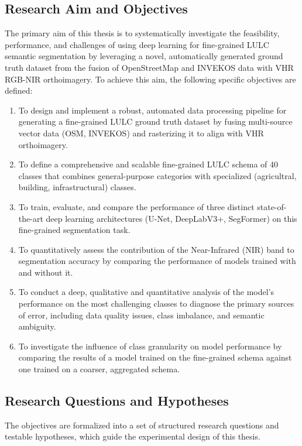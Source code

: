\documentclass{report}
\begin{document}
\subsection{Research Aim and Objectives}
The primary aim of this thesis is to systematically investigate the feasibility, performance, and challenges of using deep learning for fine-grained LULC semantic segmentation by leveraging a novel, automatically generated ground truth dataset from the fusion of OpenStreetMap and INVEKOS data with VHR RGB-NIR orthoimagery.
To achieve this aim, the following specific objectives are defined:
\begin{enumerate}
\item To design and implement a robust, automated data processing pipeline for generating a fine-grained LULC ground truth dataset by fusing multi-source vector data (OSM, INVEKOS) and rasterizing it to align with VHR orthoimagery.
\item To define a comprehensive and scalable fine-grained LULC schema of 40 classes that combines general-purpose categories with specialized (agricultral, building, infrastructural) classes.
\item To train, evaluate, and compare the performance of three distinct state-of-the-art deep learning architectures (U-Net, DeepLabV3+, SegFormer) on this fine-grained segmentation task.
\item To quantitatively assess the contribution of the Near-Infrared (NIR) band to segmentation accuracy by comparing the performance of models trained with and without it.
\item To conduct a deep, qualitative and quantitative analysis of the model's performance on the most challenging classes to diagnose the primary sources of error, including data quality issues, class imbalance, and semantic ambiguity.
\item To investigate the influence of class granularity on model performance by comparing the results of a model trained on the fine-grained schema against one trained on a coarser, aggregated schema.
\end{enumerate}
\subsection{Research Questions and Hypotheses}
The objectives are formalized into a set of structured research questions and testable hypotheses, which guide the experimental design of this thesis.
\end{document}
